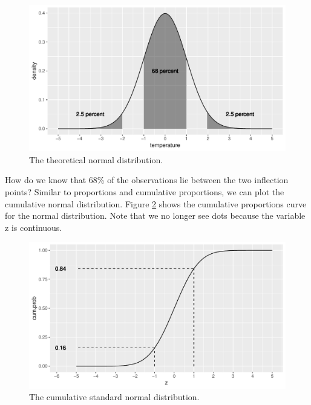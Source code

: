 \documentclass[]{report}\usepackage[]{graphicx}\usepackage[]{color}
\makeatletter
\def\maxwidth{ %
  \ifdim\Gin@nat@width>\linewidth
    \linewidth
  \else
    \Gin@nat@width
  \fi
}
\newenvironment{knitrout}{}{} %
\makeatother
\begin{document}
\begin{knitrout}
\color{fgcolor}\begin{figure}

{\centering \includegraphics[width=\maxwidth]{figure/normal_2-1} 

}

\caption[The theoretical normal distribution]{The theoretical normal distribution.}\label{fig:normal_2}
\end{figure}


\end{knitrout}

How do we know that 68\% of the observations lie between the two inflection points? Similar to proportions and cumulative proportions, we can plot the cumulative normal distribution. Figure \ref{fig:normal_3} shows the cumulative proportions curve for the normal distribution. Note that we no longer see dots because the variable z is continuous.

\begin{knitrout}
\color{fgcolor}\begin{figure}

{\centering \includegraphics[width=\maxwidth]{figure/normal_3-1} 

}

\caption[The cumulative standard normal distribution]{The cumulative standard normal distribution.}\label{fig:normal_3}
\end{figure}


\end{knitrout}
\end{document}
